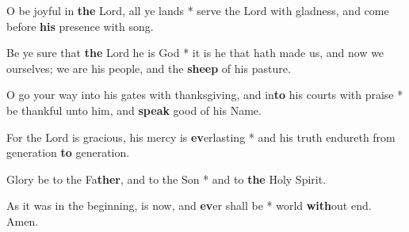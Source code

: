 \begin{multicols}{2}
	O be joyful in \textbf{the} Lord, all ye lands * serve the Lord with gladness, and come before \textbf{his} presence with song.
	
	Be ye sure that \textbf{the} Lord he is God * it is he that hath made us, and now we ourselves; we are his people, and the \textbf{sheep} of his pasture.
	
	O go your way into his gates with thanksgiving, and in\textbf{to} his courts with praise * be thankful unto him, and \textbf{speak} good of his Name.
	
	For the Lord is gracious, his mercy is \textbf{ev}erlasting * and his truth endureth from generation \textbf{to} generation.
	
	Glory be to the Fa\textbf{ther}, and to the Son * and to \textbf{the} Holy Spirit.
	
	As it was in the beginning, is now, and \textbf{ev}er shall be * world \textbf{with}out end. Amen.
\end{multicols}